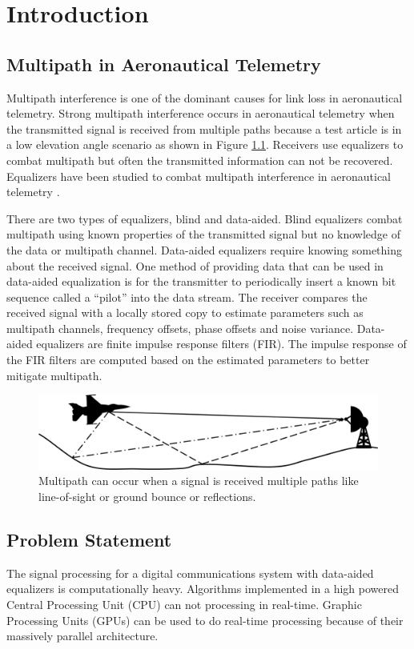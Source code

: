 \chapter{Introduction}
\section{Multipath in Aeronautical Telemetry}
Multipath interference is one of the dominant causes for link loss in aeronautical telemetry.
Strong multipath interference occurs in aeronautical telemetry when the transmitted signal is received from multiple paths because a test article is in a low elevation angle scenario as shown in Figure \ref{fig:multipath}.
Receivers use equalizers to combat multipath but often the transmitted information can not be recovered.
Equalizers have been studied to combat multipath interference in aeronautical telemetry \cite{rice-afran-saquib:2014,rice-afran-saquib-cole-rhodes-moazzami:2014}.

There are two types of equalizers, blind and data-aided.
Blind equalizers combat multipath using known properties of the transmitted signal but no knowledge of the data or multipath channel.
Data-aided equalizers require knowing something about the received signal.
One method of providing data that can be used in data-aided equalization is for the transmitter to periodically insert a known bit sequence called a ``pilot'' into the data stream.
The receiver compares the received signal with a locally stored copy to estimate parameters such as multipath channels, frequency offsets, phase offsets and noise variance.
Data-aided equalizers are finite impulse response filters (FIR). The impulse response of the FIR filters are computed based on the estimated parameters to better mitigate multipath.
\begin{figure}
	\centering\includegraphics[width=12.11in/100*50]{figures/intro/Picture1.jpg}
	\caption{Multipath can occur when a signal is received multiple paths like line-of-sight or ground bounce or reflections.}
	\label{fig:multipath}
\end{figure}
\clearpage
\section{Problem Statement}
The signal processing for a digital communications system with data-aided equalizers is computationally heavy.
Algorithms implemented in a high powered Central Processing Unit (CPU) can not processing in real-time.
Graphic Processing Units (GPUs) can be used to do real-time processing because of their massively parallel architecture.

